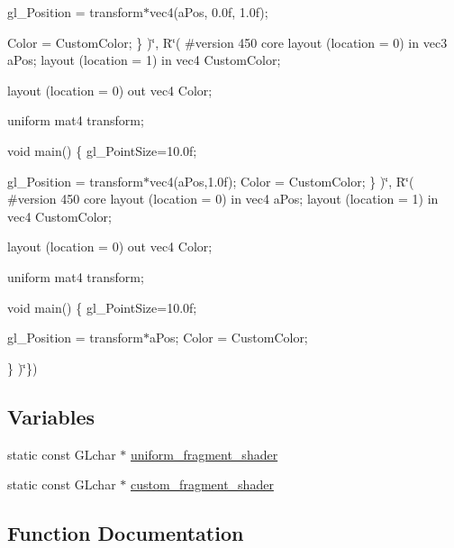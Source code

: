 \begin{DoxyCompactItemize}
gl\+\_\+\+Position = transform$\ast$vec4(a\+Pos, 0.\+0f, 1.\+0f);

\+Color = Custom\+Color;
\}
)\char`\"{}, R\char`\"{}(
\#version 450 core
layout (location = 0) in vec3 a\+Pos;
layout (location = 1) in vec4 Custom\+Color;

layout (location = 0) out vec4 Color;

uniform mat4 transform;

void main()
\{
gl\+\_\+\+Point\+Size=10.\+0f;

gl\+\_\+\+Position = transform$\ast$vec4(a\+Pos,1.\+0f);
\+Color = Custom\+Color;
\}
)\char`\"{}, R\char`\"{}(
\#version 450 core
layout (location = 0) in vec4 a\+Pos;
layout (location = 1) in vec4 Custom\+Color;

layout (location = 0) out vec4 Color;

uniform mat4 transform;

void main()
\{
gl\+\_\+\+Point\+Size=10.\+0f;

gl\+\_\+\+Position = transform$\ast$a\+Pos;
\+Color = Custom\+Color;

\}
)\char`\"{}\})
\end{DoxyCompactItemize}
\subsection*{Variables}
\begin{DoxyCompactItemize}
\item 
static const G\+Lchar $\ast$ \mbox{\hyperlink{namespaceshaders_adb630ad693498e928fa4fec5657b7fbd}{uniform\+\_\+fragment\+\_\+shader}}
\item 
static const G\+Lchar $\ast$ \mbox{\hyperlink{namespaceshaders_a53aefc57e61e6526c0469b6790903754}{custom\+\_\+fragment\+\_\+shader}}
\end{DoxyCompactItemize}


\subsection{Function Documentation}
\mbox{\label{namespaceshaders_ab9d754beb253e36c2805513fdf473da8}} 
